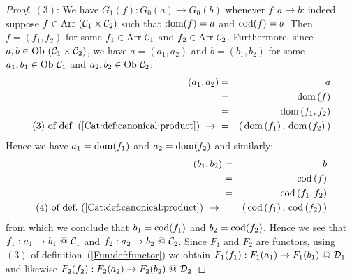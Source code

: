 \begin{proof}
    $(3)$: We have $G_{1}(f):G_{0}(a)\to G_{0}(b)$ whenever $f:a\to b$: indeed
    suppose $f\in\arr\ (\Cone\times\Ctwo)$ such that $\mbox{\rm dom}(f)=a$ and $\mbox{\rm cod}(f)=b$.
    Then $f=(f_{1},f_{2})$ for some $f_{1}\in\mbox{\rm Arr}\ \mbox{${\cal C}_{1}$}$ and $f_{2}\in\arr\ 
    \Ctwo$. Furthermore, since $a,b\in\mbox{\rm Ob}\ (\mbox{${\cal C}_{1}$}\times\mbox{${\cal C}_{2}$})$, we have
    $a=(a_{1},a_{2})$ and $b=(b_{1},b_{2})$ for some $a_{1},b_{1}\in\mbox{\rm Ob}\ \mbox{${\cal C}_{1}$}$
    and $a_{2},b_{2}\in\mbox{\rm Ob}\ \mbox{${\cal C}_{2}$}$:
        \begin{eqnarray*}(a_{1},a_{2})
            &=&a\\
            &=&\dom\,(f)\\
            &=&\dom\,(f_{1},f_{2})\\
            \mbox{$(3)$ of def.~(\ref{Cat:def:canonical:product})}\ \to\ 
            &=&(\,\dom\,(f_{1})\,,\,\dom\,(f_{2})\,)\\
        \end{eqnarray*}
    Hence we have $a_{1}=\mbox{\rm dom}(f_{1})$ and $a_{2}=\mbox{\rm dom}(f_{2})$ and similarly:
        \begin{eqnarray*}(b_{1},b_{2})
            &=&b\\
            &=&\cod\,(f)\\
            &=&\cod\,(f_{1},f_{2})\\
            \mbox{$(4)$ of def.~(\ref{Cat:def:canonical:product})}\ \to\ 
            &=&(\,\cod\,(f_{1})\,,\,\cod\,(f_{2})\,)\\
        \end{eqnarray*}
    from which we conclude that $b_{1}=\mbox{\rm cod}(f_{1})$ and $b_{2}=\mbox{\rm cod}(f_{2})$. 
    Hence we see that $f_{1}:a_{1}\to b_{1}\ @\ \mbox{${\cal C}_{1}$}$ and $f_{2}:a_{2}\to 
    b_{2}\ @\ \mbox{${\cal C}_{2}$}$. Since $F_{1}$ and $F_{2}$ are functors, using $(3)$ of
    definition~(\ref{Fun:def:functor}) we obtain $F_{1}(f_{1}): F_{1}(a_{1})
    \to F_{1}(b_{1})\ @\ \mbox{${\cal D}_{1}$}$ and likewise $F_{2}(f_{2}): F_{2}(a_{2})
    \to F_{2}(b_{2})\ @\ \mbox{${\cal D}_{2}$}$
\end{proof}
